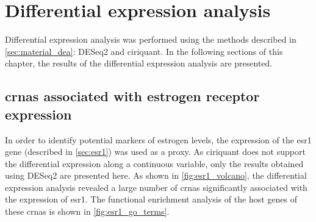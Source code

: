 \section{Differential expression analysis}
\label{sec:dea}

Differential expression analysis was performed using the methods described in
\cref{sec:material_dea}: DESeq2 and \gls{ciriquant}.
In the following sections of this chapter, the results of the differential
expression analysis are presented.

\subsection{\Glspl{crna} associated with estrogen receptor expression}

In order to identify potential markers of estrogen levels, the expression of
the \gls{esr1} gene (described in \cref{sec:esr1}) was used as a proxy.
As \gls{ciriquant} does not support the differential expression along a
continuous variable, only the results obtained using DESeq2 are presented here.
As shown in \cref{fig:esr1_volcano}, the differential expression analysis
revealed a large number of \glspl{crna} significantly associated with the
expression of \gls{esr1}.
The functional enrichment analysis of the host genes of these \glspl{crna} is
shown in \cref{fig:esr1_go_terms}.

